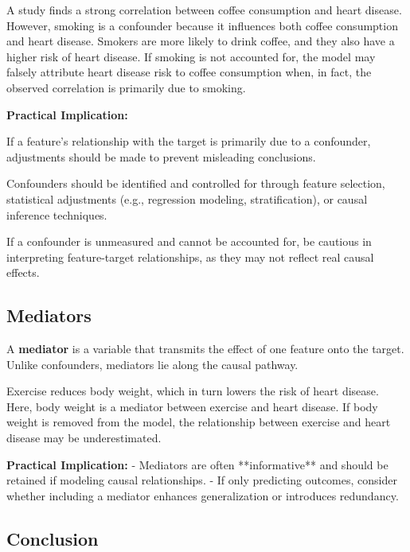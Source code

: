 \documentclass[12pt,openany]{book}
\begin{document}
\begin{examplebox}
A study finds a strong correlation between coffee consumption and heart disease. However, smoking is a confounder because it influences both coffee consumption and heart disease. Smokers are more likely to drink coffee, and they also have a higher risk of heart disease. If smoking is not accounted for, the model may falsely attribute heart disease risk to coffee consumption when, in fact, the observed correlation is primarily due to smoking.
\end{examplebox}

\textbf{Practical Implication:}

If a feature’s relationship with the target is primarily due to a confounder, adjustments should be made to prevent misleading conclusions.
\newline

Confounders should be identified and controlled for through feature selection, statistical adjustments (e.g., regression modeling, stratification), or causal inference techniques.
\newline

If a confounder is unmeasured and cannot be accounted for, be cautious in interpreting feature-target relationships, as they may not reflect real causal effects.

\subsection{Mediators}

A \textbf{mediator} is a variable that transmits the effect of one feature onto the target. Unlike confounders, mediators lie along the causal pathway.

\begin{examplebox}
Exercise reduces body weight, which in turn lowers the risk of heart disease. Here, body weight is a mediator between exercise and heart disease. If body weight is removed from the model, the relationship between exercise and heart disease may be underestimated.
\end{examplebox}

\textbf{Practical Implication:}
- Mediators are often **informative** and should be retained if modeling causal relationships.
- If only predicting outcomes, consider whether including a mediator enhances generalization or introduces redundancy.

\subsection{Conclusion}
\end{document}
